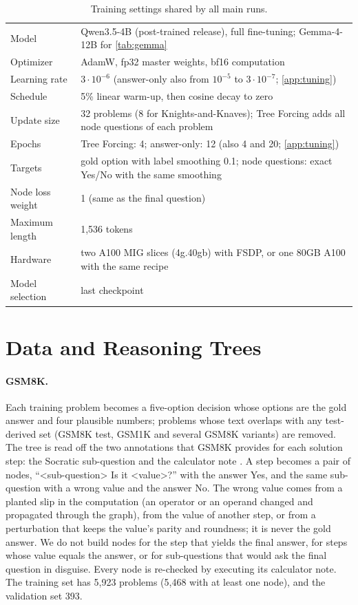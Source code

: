 \documentclass{article}
\newcommand{\tf}{Tree Forcing}
\begin{document}
\begin{table}[h]
\centering
\small
\caption{Training settings shared by all main runs.}
\label{tab:hparams}
\begin{tabular}{ll}
\toprule
Model & Qwen3.5-4B (post-trained release), full fine-tuning; Gemma-4-12B for \cref{tab:gemma} \\
Optimizer & AdamW, fp32 master weights, bf16 computation \\
Learning rate & $3\cdot10^{-6}$ (answer-only also from $10^{-5}$ to $3\cdot10^{-7}$; \cref{app:tuning}) \\
Schedule & 5\% linear warm-up, then cosine decay to zero \\
Update size & 32 problems (8 for Knights-and-Knaves); \tf{} adds all node questions of each problem \\
Epochs & \tf{}: 4; answer-only: 12 (also 4 and 20; \cref{app:tuning}) \\
Targets & gold option with label smoothing 0.1; node questions: exact Yes/No with the same smoothing \\
Node loss weight & 1 (same as the final question) \\
Maximum length & 1,536 tokens \\
Hardware & two A100 MIG slices (4g.40gb) with FSDP, or one 80GB A100 with the same recipe \\
Model selection & last checkpoint \\
\bottomrule
\end{tabular}
\end{table}

\section{Data and Reasoning Trees}
\label{app:data}

\paragraph{GSM8K.} Each training problem becomes a five-option decision whose options are the gold answer and four
plausible numbers; problems whose text overlaps with any test-derived set (GSM8K test, GSM1K and several GSM8K
variants) are removed. The tree is read off the two annotations that GSM8K provides for each solution step: the
Socratic sub-question and the calculator note \citep{cobbe2021gsm8k}. A step becomes a pair of nodes, ``<sub-question>
Is it <value>?'' with the answer Yes, and the same sub-question with a wrong value and the answer No. The wrong value
comes from a planted slip in the computation (an operator or an operand changed and propagated through the graph),
from the value of another step, or from a perturbation that keeps the value's parity and roundness; it is never the
gold answer. We do not build nodes for the step that yields the final answer, for steps whose value equals the
answer, or for sub-questions that would ask the final question in disguise. Every node is re-checked by executing its
calculator note. The training set has 5,923 problems (5,468 with at least one node), and the validation set 393.
\end{document}
